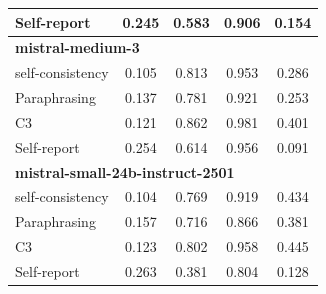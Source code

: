 \documentclass[11pt]{article}
\theoremstyle{plain}
\theoremstyle{definition}
\theoremstyle{remark}
\begin{document}
\begin{table}[p]
\begin{minipage}[t]{0.48\textwidth}
\begin{tabular}{lcccc}
        Self-report      & 0.245 & 0.583 & 0.906 & 0.154 \\
        \midrule
        \multicolumn{5}{l}{\textbf{mistral-medium-3}} \\
        self-consistency & 0.105 & 0.813 & 0.953 & 0.286 \\
        Paraphrasing     & 0.137 & 0.781 & 0.921 & 0.253 \\
       C3             & 0.121 & 0.862 & 0.981 & 0.401 \\
        Self-report      & 0.254 & 0.614 & 0.956 & 0.091 \\
        \midrule
        \multicolumn{5}{l}{\textbf{mistral-small-24b-instruct-2501}} \\
        self-consistency & 0.104 & 0.769 & 0.919 & 0.434 \\
        Paraphrasing     & 0.157 & 0.716 & 0.866 & 0.381 \\
       C3             & 0.123 & 0.802 & 0.958 & 0.445 \\
        Self-report      & 0.263 & 0.381 & 0.804 & 0.128 \\
        \bottomrule
    \end{tabular}
\end{minipage}
\end{table}
\end{document}
